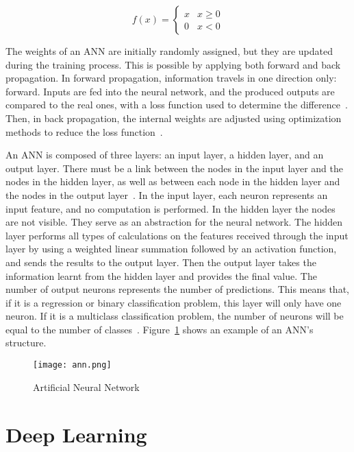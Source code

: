 \begin{equation} \label{eq:3}
    f(x) = \begin{cases}x & x \geq 0\\0 & x < 0\end{cases}
\end{equation}

The weights of an \gls{ANN} are initially randomly assigned, but they are updated during the training process. This is possible by applying both forward and back propagation. In forward propagation, information travels in one direction only: forward. Inputs are fed into the neural network, and the produced outputs are compared to the real ones, with a loss function used to determine the difference~\cite{Farizawani2020AApproaches}. Then, in back propagation, the internal weights are adjusted using optimization methods to reduce the loss function~\cite{Kim2021CBP:Method}. 

An \gls{ANN} is composed of three layers: an input layer, a hidden layer, and an output layer. There must be a link between the nodes in the input layer and the nodes in the hidden layer, as well as between each node in the hidden layer and the nodes in the output layer~\cite{Imran2019AClassification}. In the input layer, each neuron represents an input feature, and no computation is performed. In the hidden layer the nodes are not visible. They serve as an abstraction for the neural network. The hidden layer performs all types of calculations on the features received through the input layer by using a weighted linear summation followed by an activation function, and sends the results to the output layer. Then the output layer takes the information learnt from the hidden layer and provides the final value. The number of output neurons represents the number of predictions. This means that, if it is a regression or binary classification problem, this layer will only have one neuron. If it is a multiclass classification problem, the number of neurons will be equal to the number of classes~\cite{Alaloul2020DataNetworks}. Figure~\ref{fig:ann} shows an example of an \gls{ANN}'s structure.

\begin{figure}[htbp]
    \centering
    \texttt{[image: ann.png]}
    \caption{Artificial Neural Network}
    \label{fig:ann}
\end{figure}

\section{Deep Learning}\label{sec:dl}

